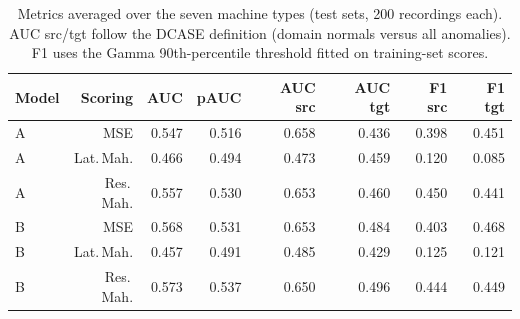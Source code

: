 \begin{table}[!htb]
\centering
\caption{Metrics averaged over the seven machine types (test sets, 200 recordings each). AUC src/tgt follow the DCASE definition (domain normals versus all anomalies). F1 uses the Gamma 90th-percentile threshold fitted on training-set scores.}
\label{tab:average}
\footnotesize
\renewcommand{\arraystretch}{1.18}
\begin{tabular}{lrrrrrrr}
\toprule
Model & Scoring & AUC & pAUC & AUC src & AUC tgt & F1 src & F1 tgt \\
\midrule
A & MSE & 0.547 & 0.516 & 0.658 & 0.436 & 0.398 & 0.451 \\
A & Lat.\,Mah. & 0.466 & 0.494 & 0.473 & 0.459 & 0.120 & 0.085 \\
A & Res.\,Mah. & 0.557 & 0.530 & 0.653 & 0.460 & 0.450 & 0.441 \\
B & MSE & 0.568 & 0.531 & 0.653 & 0.484 & 0.403 & 0.468 \\
B & Lat.\,Mah. & 0.457 & 0.491 & 0.485 & 0.429 & 0.125 & 0.121 \\
B & Res.\,Mah. & 0.573 & 0.537 & 0.650 & 0.496 & 0.444 & 0.449 \\
\bottomrule
\end{tabular}
\end{table}